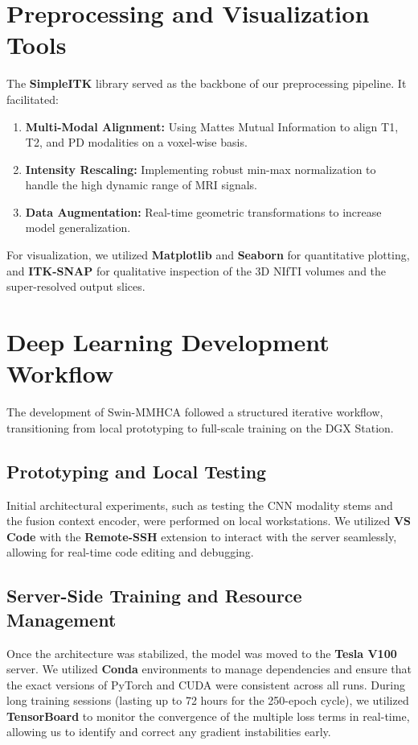 \section{Preprocessing and Visualization Tools}
The \textbf{SimpleITK} library served as the backbone of our preprocessing pipeline. It facilitated:
\begin{enumerate}
    \item \textbf{Multi-Modal Alignment:} Using Mattes Mutual Information to align T1, T2, and PD modalities on a voxel-wise basis.
    \item \textbf{Intensity Rescaling:} Implementing robust min-max normalization to handle the high dynamic range of MRI signals.
    \item \textbf{Data Augmentation:} Real-time geometric transformations to increase model generalization.
\end{enumerate}
For visualization, we utilized \textbf{Matplotlib} and \textbf{Seaborn} for quantitative plotting, and \textbf{ITK-SNAP} for qualitative inspection of the 3D NIfTI volumes and the super-resolved output slices.

\section{Deep Learning Development Workflow}
The development of Swin-MMHCA followed a structured iterative workflow, transitioning from local prototyping to full-scale training on the DGX Station.

\subsection{Prototyping and Local Testing}
Initial architectural experiments, such as testing the CNN modality stems and the fusion context encoder, were performed on local workstations. We utilized \textbf{VS Code} with the \textbf{Remote-SSH} extension to interact with the server seamlessly, allowing for real-time code editing and debugging.

\subsection{Server-Side Training and Resource Management}
Once the architecture was stabilized, the model was moved to the \textbf{Tesla V100} server. We utilized \textbf{Conda} environments to manage dependencies and ensure that the exact versions of PyTorch and CUDA were consistent across all runs. During long training sessions (lasting up to 72 hours for the 250-epoch cycle), we utilized \textbf{TensorBoard} to monitor the convergence of the multiple loss terms in real-time, allowing us to identify and correct any gradient instabilities early.

